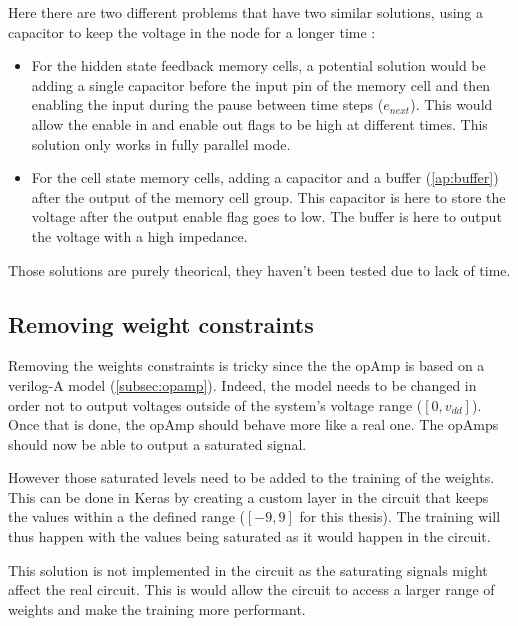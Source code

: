Here there are two different problems that have two similar solutions, using a capacitor to keep the voltage in the node for a longer time :
\begin{itemize}
  \item For the hidden state feedback memory cells, a potential solution would be adding a single capacitor before the input pin of the memory cell and then enabling the input during the pause between time steps ($e_{next}$). This would allow the enable in and enable out flags to be high at different times. This solution only works in fully parallel mode.
  \item For the cell state memory cells, adding a capacitor and a buffer (\cref{ap:buffer}) after the output of the memory cell group. This capacitor is here to store the voltage after the output enable flag goes to low. The buffer is here to output the voltage with a high impedance.
\end{itemize}

Those solutions are purely theorical, they haven't been tested due to lack of time.

\subsection{Removing weight constraints}\label{subsec:noCons}

Removing the weights constraints is tricky since the the \ac{opAmp} is based on a verilog-A model (\cref{subsec:opamp}). Indeed, the model needs to be changed in order not to output voltages outside of the system's voltage range ($[0,v_{dd}]$). Once that is done, the \ac{opAmp} should behave more like a real one. The \acp{opAmp} should now be able to output a saturated signal.

However those saturated levels need to be added to the training of the weights. This can be done in Keras by creating a custom layer in the circuit that keeps the values within a the defined range ($[-9,9]$ for this thesis). The training will thus happen with the values being saturated as it would happen in the circuit.

This solution is not implemented in the circuit as the saturating signals might affect the real circuit. This is would allow the circuit to access a larger range of weights and make the training more performant.
